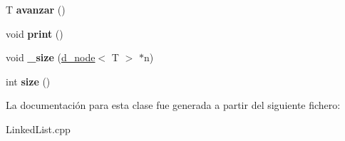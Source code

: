 \begin{DoxyCompactItemize}
T {\bfseries avanzar} ()
\item 
\mbox{\label{classdouble__linked__list_aaaded0e7d96f67ca1652e8b3b4e2ba0b}} 
void {\bfseries print} ()
\item 
\mbox{\label{classdouble__linked__list_ace6c38d671f63f7ccdbe8492e01208a2}} 
void {\bfseries \+\_\+size} (\hyperlink{classd__node}{d\+\_\+node}$<$ T $>$ $\ast$n)
\item 
\mbox{\label{classdouble__linked__list_af445b5031cb0a7213a4ed5d4f3738fdb}} 
int {\bfseries size} ()
\end{DoxyCompactItemize}


La documentación para esta clase fue generada a partir del siguiente fichero\+:\begin{DoxyCompactItemize}
\item 
Linked\+List.\+cpp\end{DoxyCompactItemize}
